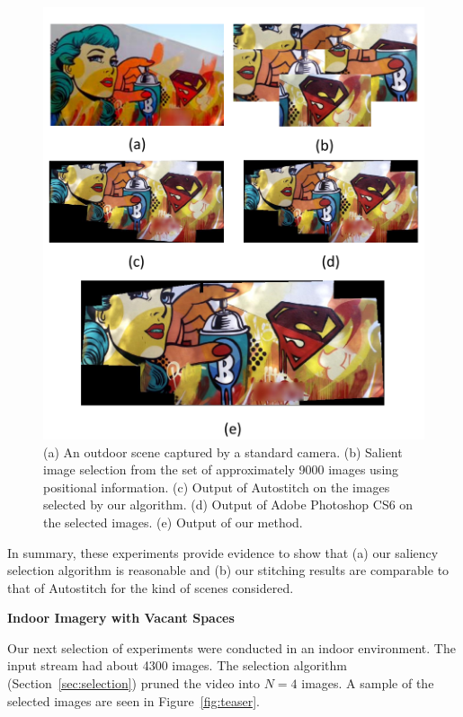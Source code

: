 \documentclass[11pt]{article}
\begin{document}
\begin{figure}[h!]
\centering
\includegraphics[width=0.87\linewidth]{mosaicing/results/sac1}
\caption{ (a) An outdoor scene captured by a standard camera.  (b) Salient image selection from the set of
  approximately 9000 images using positional information. (c) Output of
  Autostitch \cite{autostitch} on the images selected by our algorithm. (d) Output of Adobe Photoshop CS6
  \cite{photoshop} on the selected images. (e) Output of our method.}
\label{fig:validResults}
\end{figure}

In summary, these experiments provide evidence to show that (a) our
saliency selection algorithm is reasonable and (b) our stitching
results are comparable to that of Autostitch for the kind of scenes
considered.

\noindent\textbf{Indoor Imagery with Vacant Spaces}

Our next selection of experiments were conducted in an indoor
environment.  The input stream had about 4300 images. The selection algorithm
(Section~\ref{sec:selection}) pruned the video into $N=4$ images.
A sample of the selected images are seen in Figure~\ref{fig:teaser}.
\end{document}
